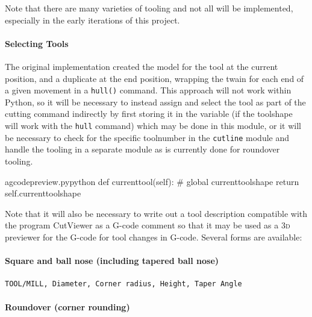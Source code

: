 \documentclass{ltxdoc}
\begin{document}

Note that there are many varieties of tooling and not all will be implemented, especially in the early iterations of this project.
 
\paragraph{Selecting Tools}
 
The original implementation created the model for the tool at the current position, and a duplicate at the end position, wrapping the twain for each end of a given movement in a \verb|hull()| command. This approach will not work within Python, so it will be necessary to instead assign and select the tool as part of the cutting command indirectly by first storing it in the variable  (if the toolshape will work with the \verb|hull| command) which may be done in this module, or it will be necessary to check for the specific toolnumber in the \verb|cutline| module and handle the tooling in a separate module as is currently done for roundover tooling.

\lstset{firstnumber=\thegcpy}
\begin{writecode}{a}{gcodepreview.py}{python}
    def currenttool(self):
#        global currenttoolshape
        return self.currenttoolshape

\end{writecode}
\addtocounter{gcpy}{4}

Note that it will also be necessary to write out a tool description compatible with the program CutViewer as a G-code comment so that it may be used as a \textsc{3d} previewer for the G-code for tool changes in G-code. Several forms are available:

\paragraph{Square and ball nose (including tapered ball nose)}

\begin{verbatim}
TOOL/MILL, Diameter, Corner radius, Height, Taper Angle
\end{verbatim}

\paragraph{Roundover (corner rounding)}
\end{document}
